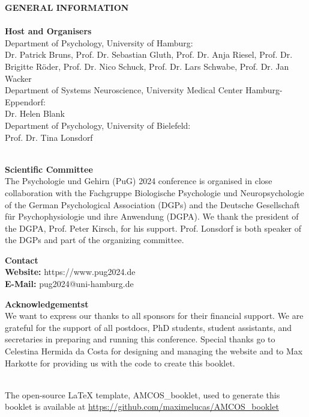 \vspace*{1cm}
\begin{center}
	\textbf{GENERAL INFORMATION} \\
	\ \\[\baselineskip]

	\textcolor{\primarycolor}{\textbf{Host and Organisers}}	 \\
	Department of Psychology, University of Hamburg: \\
	Dr. Patrick Bruns, Prof. Dr. Sebastian Gluth, Prof. Dr. Anja Riesel, Prof. Dr. Brigitte Röder, Prof. Dr. Nico Schuck, Prof. Dr. Lars Schwabe, Prof. Dr. Jan Wacker \\
	\vspace*{0.1cm}
	Department of Systems Neuroscience, University Medical Center Hamburg-Eppendorf: \\
	Dr. Helen Blank \\
	\vspace*{0.1cm}
	Department of Psychology, University of Bielefeld: \\
	Prof. Dr. Tina Lonsdorf \\
	\ \\[\baselineskip]
	\vspace*{0.1cm}
	
	\textcolor{\primarycolor}{\textbf {Scientific Committee}}	 \\
	The Psychologie und Gehirn (PuG) 2024 conference is organised in close collaboration with the Fachgruppe Biologische Psychologie und Neuropsychologie of the German Psychological Association (DGPs) and the Deutsche Gesellschaft für Psychophysiologie und ihre Anwendung (DGPA). We thank the president of the DGPA, Prof. Peter Kirsch, for his support. Prof. Lonsdorf is both speaker of the DGPs and part of the organizing committee.
	\\[\baselineskip]
	\vspace*{0.1cm}

	\textcolor{\primarycolor}{\textbf {Contact}}	 \\
	\textbf{Website:} https://www.pug2024.de \\
	\textbf{E-Mail:} pug2024@uni-hamburg.de
	\\[\baselineskip]
	\vspace*{0.1cm}

	\textcolor{\primarycolor}{\textbf {Acknowledgementst}}	 \\
	We want to express our thanks to all sponsors for their financial support. We are grateful for the support of all postdocs, PhD students, student assistants, and secretaries in preparing and running this conference. Special thanks go to Celestina Hermida da Costa for designing and managing the website and to Max Harkotte for providing us with the code to create this booklet.

\end{center}
\mbox{}
\thispagestyle{empty}
\vfill
\begin{center}
	\ \\[20pt] %
	The open-source \LaTeX{} template, AMCOS\_booklet, used to generate this booklet is available at \url{https://github.com/maximelucas/AMCOS\_booklet}
\end{center}

\newpage